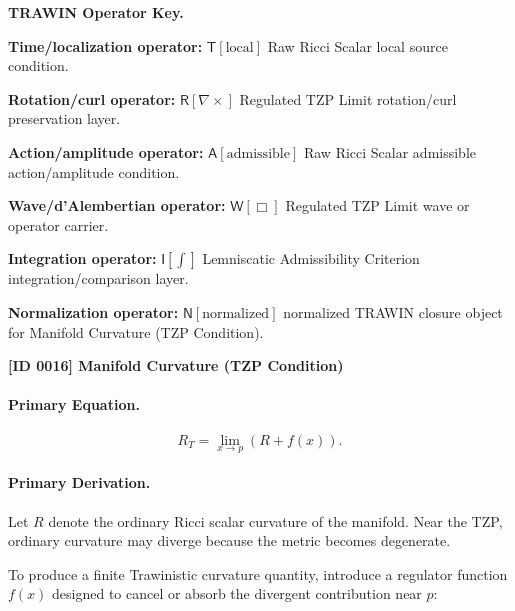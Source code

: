 \par\vspace{0.45\baselineskip}
\noindent\begin{minipage}[t]{\linewidth}
\begingroup
\small
\raggedright
\textbf{TRAWIN Operator Key.}\par
\noindent\textbf{Time/localization operator:} $\mathsf{T}\!\left[\mathrm{local}\right]$ Raw Ricci Scalar local source condition.\par
\noindent\textbf{Rotation/curl operator:} $\mathsf{R}\!\left[\nabla\times\right]$ Regulated TZP Limit rotation/curl preservation layer.\par
\noindent\textbf{Action/amplitude operator:} $\mathsf{A}\!\left[\mathrm{admissible}\right]$ Raw Ricci Scalar admissible action/amplitude condition.\par
\noindent\textbf{Wave/d'Alembertian operator:} $\mathsf{W}\!\left[\Box\right]$ Regulated TZP Limit wave or operator carrier.\par
\noindent\textbf{Integration operator:} $\mathsf{I}\!\left[\int\right]$ Lemniscatic Admissibility Criterion integration/comparison layer.\par
\noindent\textbf{Normalization operator:} $\mathsf{N}\!\left[\mathrm{normalized}\right]$ normalized TRAWIN closure object for Manifold Curvature (TZP Condition).\par
\endgroup
\end{minipage}

\clearpage
\noindent\textbf{[ID 0016] Manifold Curvature (TZP Condition)}\par
\vspace{0.35em}
\paragraph{Primary Equation.}
\begin{equation}
R_T
=
\lim_{x\to p}
\left(
R+f(x)
\right).
\end{equation}

\paragraph{Primary Derivation.}
Let $R$ denote the ordinary Ricci scalar curvature of the manifold.  
Near the TZP, ordinary curvature may diverge because the metric becomes degenerate.

To produce a finite Trawinistic curvature quantity, introduce a regulator function $f(x)$ designed to cancel or absorb the divergent contribution near $p$:

